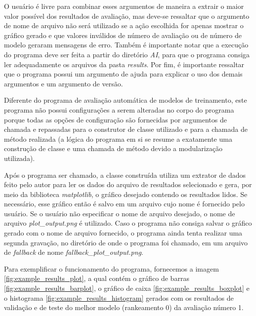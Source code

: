 O usuário é livre para combinar esses argumentos de maneira a extrair o maior valor possível dos resultados de avaliação, mas deve-se ressaltar que o argumento de nome de arquivo não será utilizado se a ação escolhida for apenas mostrar o gráfico gerado e que valores inválidos de número de avaliação ou de número de modelo geraram mensagens de erro. Também é importante notar que a execução do programa deve ser feita a partir do diretório \textit{AI}, para que o programa consiga ler adequadamente os arquivos da pasta \textit{results}. Por fim, é importante ressaltar que o programa possui um argumento de ajuda para explicar o uso dos demais argumentos e um argumento de versão.

Diferente do programa de avaliação automática de modelos de treinamento, este programa não possui configurações a serem alteradas no corpo do programa porque todas as opções de configuração são fornecidas por argumentos de chamada e repassadas para o construtor de classe utilizado e para a chamada de método realizada (a lógica do programa em si se resume a exatamente uma construção de classe e uma chamada de método devido a modularização utilizada).

Após o programa ser chamado, a classe construída utiliza um extrator de dados feito pelo autor para ler os dados do arquivo de resultados selecionado e gera, por meio da biblioteca \textit{matplotlib}, o gráfico desejado contendo os resultados lidos. Se necessário, esse gráfico então é salvo em um arquivo cujo nome é fornecido pelo usuário. Se o usuário não especificar o nome de arquivo desejado, o nome de arquivo \textit{plot\_output.png} é utilizado. Caso o programa não consiga salvar o gráfico gerado com o nome de arquivo fornecido, o programa ainda tenta realizar uma segunda gravação, no diretório de onde o programa foi chamado, em um arquivo de \textit{fallback} de nome \textit{fallback\_plot\_output.png}.

Para exemplificar o funcionamento do programa, fornecemos a imagem \ref{fig:example_results_plot}, a qual contém o gráfico de barras \ref{fig:example_results_barplot}, o gráfico de caixa \ref{fig:example_results_boxplot} e o histograma \ref{fig:example_results_histogram} gerados com os resultados de validação e de teste do melhor modelo (rankeamento 0) da avaliação número 1.

